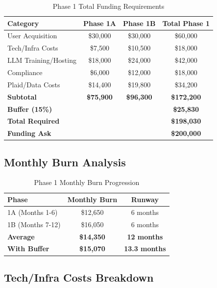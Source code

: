 \documentclass[11pt,letterpaper]{article}
\begin{document}
\begin{table}[h]
\centering
\caption{Phase 1 Total Funding Requirements}
\begin{tabular}{|l|c|c|c|}
\hline
\textbf{Category} & \textbf{Phase 1A} & \textbf{Phase 1B} & \textbf{Total Phase 1} \\
\hline
User Acquisition & \$30,000 & \$30,000 & \$60,000 \\
Tech/Infra Costs & \$7,500 & \$10,500 & \$18,000 \\
LLM Training/Hosting & \$18,000 & \$24,000 & \$42,000 \\
Compliance & \$6,000 & \$12,000 & \$18,000 \\
Plaid/Data Costs & \$14,400 & \$19,800 & \$34,200 \\
\textbf{Subtotal} & \textbf{\$75,900} & \textbf{\$96,300} & \textbf{\$172,200} \\
\textbf{Buffer (15\%)} & & & \textbf{\$25,830} \\
\textbf{Total Required} & & & \textbf{\$198,030} \\
\textbf{Funding Ask} & & & \textbf{\$200,000} \\
\hline
\end{tabular}
\end{table}

\subsection{Monthly Burn Analysis}

\begin{table}[h]
\centering
\caption{Phase 1 Monthly Burn Progression}
\begin{tabular}{|l|c|c|}
\hline
\textbf{Phase} & \textbf{Monthly Burn} & \textbf{Runway} \\
\hline
1A (Months 1-6) & \$12,650 & 6 months \\
1B (Months 7-12) & \$16,050 & 6 months \\
\textbf{Average} & \textbf{\$14,350} & \textbf{12 months} \\
\textbf{With Buffer} & \textbf{\$15,070} & \textbf{13.3 months} \\
\hline
\end{tabular}
\end{table}

\subsection{Tech/Infra Costs Breakdown}
\end{document}
